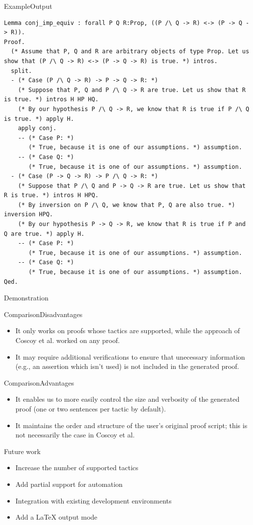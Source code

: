 \documentclass[pdf]{beamer}
\begin{document}
\begin{frame}[fragile]{Example}{Output}
\begin{lstlisting}[label=listing:output, captionpos=b, caption={Output in annotation mode},basicstyle=\tt\tiny]
Lemma conj_imp_equiv : forall P Q R:Prop, ((P /\ Q -> R) <-> (P -> Q -> R)).
Proof.
  (* Assume that P, Q and R are arbitrary objects of type Prop. Let us show that (P /\ Q -> R) <-> (P -> Q -> R) is true. *) intros.
  split.
  - (* Case (P /\ Q -> R) -> P -> Q -> R: *) 
    (* Suppose that P, Q and P /\ Q -> R are true. Let us show that R is true. *) intros H HP HQ.
    (* By our hypothesis P /\ Q -> R, we know that R is true if P /\ Q  is true. *) apply H.
    apply conj.
    -- (* Case P: *)
       (* True, because it is one of our assumptions. *) assumption.
    -- (* Case Q: *)
       (* True, because it is one of our assumptions. *) assumption.
  - (* Case (P -> Q -> R) -> P /\ Q -> R: *)
    (* Suppose that P /\ Q and P -> Q -> R are true. Let us show that R is true. *) intros H HPQ.
    (* By inversion on P /\ Q, we know that P, Q are also true. *) inversion HPQ.
    (* By our hypothesis P -> Q -> R, we know that R is true if P and Q are true. *) apply H.
    -- (* Case P: *)
       (* True, because it is one of our assumptions. *) assumption.
    -- (* Case Q: *)
       (* True, because it is one of our assumptions. *) assumption.
Qed.
\end{lstlisting}
\end{frame}

\begin{frame}
    \Huge \center Demonstration
\end{frame}

\begin{frame}{Comparison}{Disadvantages}
    \begin{itemize}
        \item{It only works on proofs whose tactics are supported, while the approach of Coscoy et al. worked on any proof.}
        \item{It may require additional verifications to ensure that unecessary information (e.g., an assertion which isn't used) is not included in the generated proof.}
    \end{itemize}
\end{frame}

\begin{frame}{Comparison}{Advantages}
    \begin{itemize}
        \item{It enables us to more easily control the size and verbosity of the generated proof (one or two sentences per tactic by default).}
        \item{It maintains the order and structure of the user's original proof script; this is not necessarily the case in Coscoy et al. }
      \end{itemize}
\end{frame}

\begin{frame}{Future work}
    \begin{itemize}
        \item Increase the number of supported tactics
        \item Add partial support for automation
        \item Integration with existing development environments
        \item Add a LaTeX output mode
    \end{itemize}
\end{frame}
\end{document}

